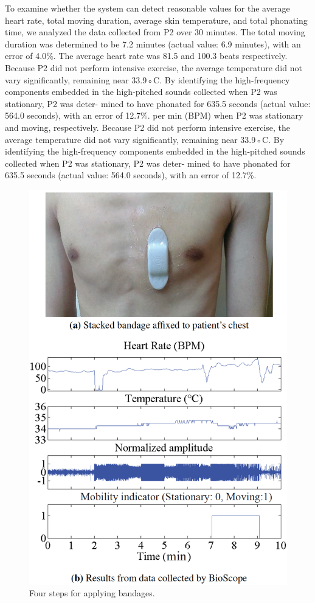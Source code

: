 To examine whether the system can detect reasonable values for the average heart rate, total moving duration, average skin temperature, and total phonating time, we analyzed the data collected from P2 over 30 minutes. The total moving duration was determined to be 7.2 minutes (actual value: 6.9 minutes), with an error of 4.0\%. The average heart rate was 81.5 and 100.3 beats respectively.  Because P2 did not perform intensive exercise, the average temperature did not vary significantly, remaining near 33.9◦C. By identifying the high-frequency components embedded in the high-pitched sounds collected when P2 was stationary, P2 was deter- mined to have phonated for 635.5 seconds (actual value: 564.0 seconds), with an error of 12.7\%. per min (BPM) when P2 was stationary and moving, respectively.  Because P2 did not perform intensive exercise, the average temperature did not vary significantly, remaining near 33.9◦C. By identifying the high-frequency components embedded in the high-pitched sounds collected when P2 was stationary, P2 was deter- mined to have phonated for 635.5 seconds (actual value: 564.0 seconds), with an error of 12.7\%.

\begin{figure}[!ht]
\centering
\includegraphics[width=12cm]{image/bio_fig4}
\caption{Four steps for applying bandages.}
\label{bio_exp_result}
\end{figure}


